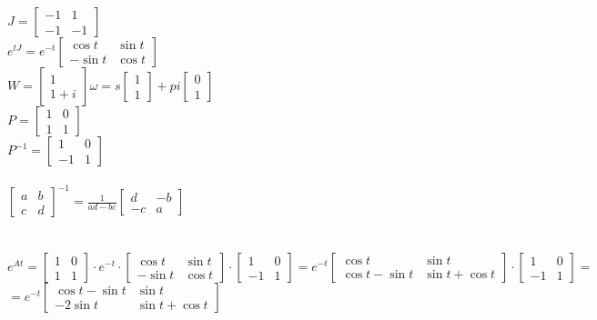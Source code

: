 $J=\left[\begin{array}{cc}-1&1\\-1&-1\end{array}\right]$\\
$e^{tJ}=e^{-t}\left[\begin{array}{cc}\cos t & \sin t \\ -\sin t & \cos t\end{array}\right]$\\
$W=\left[\begin{array}{c}1\\1+i\end{array}\right]\omega=s\left[\begin{array}{c}1\\1\end{array}\right]+pi\left[\begin{array}{c}0\\1\end{array}\right]$\\
$P=\left[\begin{array}{cc}1&0\\1&1\end{array}\right]$\\
$P^{-1}=\left[\begin{array}{cc}1&0\\-1&1\end{array}\right]$\\\\
$\boxed{\left[\begin{array}{cc}a&b\\c&d\end{array}\right]^{-1}=\frac{1}{ad-bc}\left[\begin{array}{cc}d&-b\\-c&a\end{array}\right]}$\\\\\\
$e^{At}=\left[\begin{array}{cc}1&0\\1&1\end{array}\right]\cdot e^{-t}\cdot\left[\begin{array}{cc}\cos t&\sin t \\-\sin t &\cos t\end{array}\right]\cdot \left[\begin{array}{cc}1&0\\-1&1\end{array}\right]=e^{-t}\left[\begin{array}{cc}\cos t & \sin t \\ \cos t-\sin t & \sin t +\cos t\end{array}\right]\cdot \left[\begin{array}{cc}1&0\\-1 &1\end{array}\right]=$\\
$=e^{-t}\left[\begin{array}{cc}\cos t - \sin t & \sin t \\-2\sin t &\sin t +\cos t\end{array}\right]$\\


